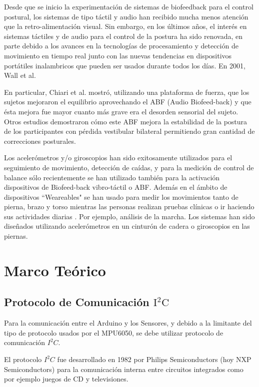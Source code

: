 \documentclass[12pt,a4paper]{article}
\begin{document}
Desde que se inicio la experimentación de sistemas de biofeedback para el control postural, los sistemas de tipo táctil y audio han recibido mucha menos atención que la retro-alimentación visual.
Sin embargo, en los últimos años, el interés en sistemas táctiles y de audio para el control de la postura ha sido renovada, en parte debido a los avances en la tecnologías de procesamiento y detección de movimiento en tiempo real junto con las nuevas tendencias en dispositivos portátiles inalambricos que pueden ser usados durante todos los días. 
En 2001, Wall et al. \cite{giansanti_energetic_2009} 

En particular, Chiari et al. mostró, utilizando una plataforma de fuerza, que los sujetos mejoraron el equilibrio aprovechando el ABF (Audio Biofeed-back) y que ésta mejora fue mayor cuanto más grave era el desorden sensorial del sujeto. Otros estudios demostraron cómo este ABF \cite{giansanti_energetic_2009} mejora la estabilidad de la postura de los participantes con pérdida vestibular bilateral permitiendo gran cantidad de correcciones posturales.

Los acelerómetros y/o giroscopios han sido exitosamente utilizados \cite{mancini_relevance_2010} para el seguimiento de movimiento,  detección de caídas, y para la medición de control de balance sólo recientemente se han utilizado también para la activación dispositivos de Biofeed-back vibro-táctil o ABF. Además en el ámbito de dispositivos ``Weareables" se han usado para medir los movimientos tanto de pierna, brazo y torso mientras las personas realizan pruebas clínicas o ir haciendo sus actividades diarias \cite{mancini_relevance_2010}. Por ejemplo, análisis de la marcha.
Los sistemas han sido diseñados utilizando acelerómetros en un cinturón de cadera o giroscopios en las piernas.



\section{Marco Teórico}

\subsection{Protocolo de Comunicación $\mathbf{\mathrm{I^2C}}$}
Para la comunicación entre el Arduino y los Sensores, y debido a la limitante del tipo de protocolo usados por el MPU6050, se debe utilizar protocolo de comunicación $I^2C$.

El protocolo $I^2C$ fue desarrollado en 1982 por Philips Semiconductors (hoy NXP Semiconductors) para la comunicación interna entre circuitos integrados como por ejemplo juegos de CD y televisiones.
\end{document}
